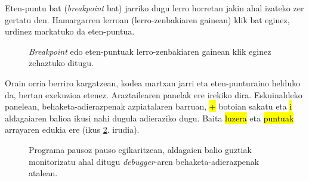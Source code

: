Eten-puntu bat (\textit{breakpoint} bat) jarriko dugu lerro horretan jakin ahal izateko zer gertatu den. Hamargarren lerroan (lerro-zenbakiaren gainean) klik bat eginez, urdinez markatuko da eten-puntua.

\begin{figure}[ht]
	\centering
{}
\caption{\textit{Breakpoint} edo eten-puntuak lerro-zenbakiaren gainean klik eginez zehaztuko ditugu.}
\label{fig:araztaile2}
\end{figure}

Orain orria berriro kargatzean, kodea martxan jarri eta eten-punturaino helduko da, bertan exekuzioa etenez. Araztailearen panelak ere irekiko dira. Eskuinaldeko panelean, behaketa-adierazpenak azpiatalaren barruan, \hl{+}  botoian sakatu eta \hl{i} aldagaiaren balioa ikusi nahi dugula adieraziko dugu. Baita \hl{luzera} eta \hl{puntuak} arrayaren edukia ere (ikus \ref{fig:araztaile3}. irudia).

\begin{figure}[ht]
	\centering
{}
\caption{Programa pausoz pauso egikaritzean, aldagaien balio guztiak monitorizatu ahal ditugu \textit{debugger}-aren behaketa-adierazpenak atalean.}
\label{fig:araztaile3}
\end{figure}

